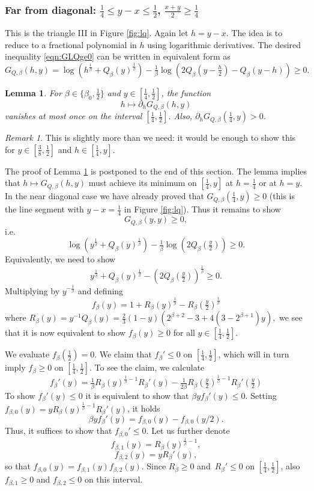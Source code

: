 \documentclass[12pt]{amsart}
\theoremstyle{plain}
\newtheorem{lem}[thm]{Lemma}
\theoremstyle{definition}
\theoremstyle{remark}
\newtheorem{rem}[thm]{Remark}
\numberwithin{equation}{section}
\begin{document}
\subsubsection{Far from diagonal: $\tfrac14\le y-x\le \tfrac12$, $\frac{x+y}2\ge \frac14$}
\label{sec:Q-III}
This is the triangle III in Figure \ref{fig:lq}.
Again let $h=y-x$. 
The idea is to reduce to a fractional polynomial in $h$ using logarithmic derivatives.
The desired inequality \eqref{eqn:GLQge0} can be written in equivalent form as
\[ G_{Q,\beta}(h,y)=\log(h^{\frac1\beta} + Q_\beta(y)^{\frac1\beta}) - \tfrac1\beta \log(2 Q_\beta(y - \tfrac{h}{2}) - Q_\beta(y - h))\ge 0. \]
\begin{lem}\label{lem:LQIII}
For $\beta\in \{\beta_0,\frac12\}$ and $y\in[\frac14,\frac12]$, the function
\[h\mapsto \partial_h G_{Q,\beta}(h,y)\]
vanishes at most once on the interval $[\tfrac14, \tfrac12]$. Also, $\partial_h G_{Q,\beta}(\tfrac14,y)>0$.
\end{lem}
\begin{rem}
This is slightly more than we need: it would be enough to show this for $y\in [\frac38,\frac12]$ and $h\in [\tfrac14,y]$.
\end{rem}
The proof of Lemma \ref{lem:LQIII} is postponed to the end of this section.
The lemma implies that 
$h\mapsto G_{Q,\beta}(h,y)$ must achieve its minimum on $[\frac14,y]$ at $h=\frac14$ or at $h=y$.
In the near diagonal case we have already proved that $G_{Q,\beta}(\tfrac14,y)\ge 0$ (this is the line segment with $y-x=\tfrac14$ in Figure \ref{fig:lq}).
Thus it remains to show
\[ G_{Q,\beta}(y,y)\ge 0, \]
i.e. 
\[ \log(y^{\frac1\beta} + Q_\beta(y)^{\frac1\beta}) - \tfrac1\beta \log(2 Q_\beta(\tfrac{y}{2}))\geq 0.\]
Equivalently, we need to show
\[y^{\frac1\beta} + Q_\beta(y)^{\frac1\beta} - (2 Q_\beta(\tfrac{y}{2}))^{\tfrac1\beta }\geq 0.\]
Multiplying by $y^{-\tfrac{1}{\beta}}$ and defining
\[f_\beta(y)=1+R_\beta(y)^{\frac{1}{\beta}}-R_\beta(\tfrac{y}{2})^{\frac{1}{\beta}}\]
where 
$R_\beta(y) = y^{-1}Q_\beta(y) = \tfrac23  (1-y)(2^{\beta+2}-3+4(3-2^{\beta+1})  y),$
we see that it is now equivalent to show 
$f_\beta(y) \geq 0$ 
for  all $y\in [\tfrac{1}{4},\tfrac{1}{2}]$. 

We evaluate  $f_\beta(\tfrac{1}{2})=0$.  We claim that $f_\beta' \leq 0$ on $[\tfrac{1}{4},\tfrac{1}{2}]$, which will in turn imply $f_\beta\geq 0$ on $[\tfrac{1}{4},\tfrac{1}{2}]$.
To see the claim, we calculate
\[f_\beta'(y) = \tfrac{1}{\beta}R_\beta(y)^{\frac{1}{\beta}-1}R_\beta'(y) - \tfrac{1}{2\beta}R_\beta(\tfrac{y}{2})^{\frac{1}{\beta}-1}R_\beta'(\tfrac{y}{2})\]
 To show $f_\beta'(y)\leq 0$ it is equivalent  to  show that $\beta y f_\beta'(y)\leq 0$. 
Setting $f_{\beta,0}(y)=yR_\beta(y)^{\frac{1}{\beta}-1}R_\beta'(y)$,   it holds
\[\beta y f_\beta'(y) = f_{\beta,0}(y)-f_{\beta,0}(y/2).\]
 Thus, it suffices to show that $f_{\beta,0}'\leq 0$.
Let us further denote 
\[f_{\beta,1}(y)=R_\beta(y)^{\frac{1}{\beta}-1},\]
\[f_{\beta,2}(y)=yR_\beta'(y),\]
 so that $f_{\beta,0}(y)=f_{\beta,1}(y)f_{\beta,2}(y)$. 
Since  $R_\beta\geq  0$ and $\,R_\beta'\leq  0$ on $[\tfrac{1}{4},\tfrac{1}{2}]$, also $f_{\beta,1}\geq  0$ and $f_{\beta,2}\leq  0$ on this interval. 
 
\end{document}
